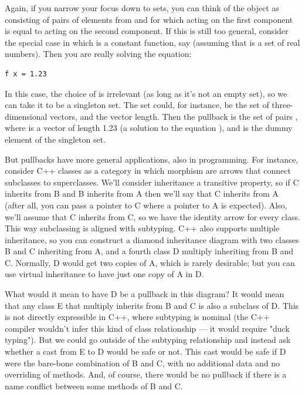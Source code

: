 Again, if you narrow your focus down to sets, you can think of the
object  as consisting of pairs of elements from  and
 for which  acting on the first component is equal
to  acting on the second component. If this is still too
general, consider the special case in which  is a constant
function, say  (assuming that  is a set
of real numbers). Then you are really solving the equation:

\begin{verbatim}
f x = 1.23
\end{verbatim}

In this case, the choice of  is irrelevant (as long as it's
not an empty set), so we can take it to be a singleton set. The set
 could, for instance, be the set of three-dimensional vectors,
and  the vector length. Then the pullback is the set of pairs
, where  is a vector of length 1.23 (a
solution to the equation ), and
\code{()} is the dummy element of the singleton set.

But pullbacks have more general applications, also in programming. For
instance, consider C++ classes as a category in which morphism are
arrows that connect subclasses to superclasses. We'll consider
inheritance a transitive property, so if C inherits from B and B
inherits from A then we'll say that C inherits from A (after all, you
can pass a pointer to C where a pointer to A is expected). Also, we'll
assume that C inherits from C, so we have the identity arrow for every
class. This way subclassing is aligned with subtyping. C++ also supports
multiple inheritance, so you can construct a diamond inheritance diagram
with two classes B and C inheriting from A, and a fourth class D
multiply inheriting from B and C. Normally, D would get two copies of A,
which is rarely desirable; but you can use virtual inheritance to have
just one copy of A in D.

What would it mean to have D be a pullback in this diagram? It would
mean that any class E that multiply inherits from B and C is also a
subclass of D. This is not directly expressible in C++, where subtyping
is nominal (the C++ compiler wouldn't infer this kind of class
relationship --- it would require "duck typing"). But we could go
outside of the subtyping relationship and instead ask whether a cast
from E to D would be safe or not. This cast would be safe if D were the
bare-bone combination of B and C, with no additional data and no
overriding of methods. And, of course, there would be no pullback if
there is a name conflict between some methods of B and C.

